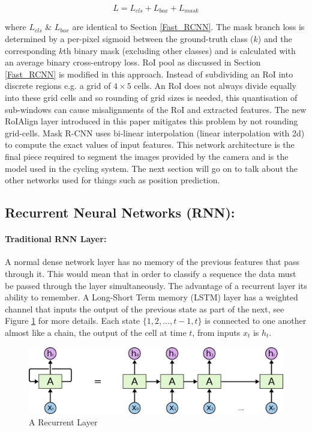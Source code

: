 \documentclass[11pt,twoside]{report}
\begin{document}
\begin{equation}
\label{maskrcnnloss}
L = L_{cls} + L_{box} + L_{mask}
\end{equation}

where $L_{cls}$ \& $L_{box}$ are identical to Section \ref{Fast_RCNN}. The mask branch loss is determined by a per-pixel sigmoid between the ground-truth class ($k$) and the corresponding $k$th binary mask (excluding other classes) and is calculated with an average binary cross-entropy loss.
\newline \newline
RoI pool as discussed in Section \ref{Fast_RCNN} is modified in this approach. Instead of subdividing an RoI into discrete regions e.g. a grid of $4 \times 5$ cells. An RoI does not always divide equally into these grid cells and so rounding of grid sizes is needed, this quantisation of sub-windows can cause misalignments of the RoI and extracted features. The new RoIAlign layer introduced in this paper mitigates this problem by not rounding grid-cells. Mask R-CNN uses bi-linear interpolation (linear interpolation with 2d) to compute the exact values of input features.
\newline \newline
This network architecture is the final piece required to segment the images provided by the camera and is the model used in the cycling system. The next section will go on to talk about the other networks used for things such as position prediction.
\subsection{Recurrent Neural Networks (RNN):}

\paragraph{Traditional RNN Layer:}A normal dense network layer has no memory of the previous features that pass through it. This would mean that in order to classify a sequence the data must be passed through the layer simultaneously. The advantage of a recurrent layer its ability to remember. A Long-Short Term memory (LSTM) layer has a weighted channel that inputs the output of the previous state as part of the next, see Figure \ref{rnn_unrolled} for more details. Each state $ \{ 1,2,...,t-1,t \}$ is connected to one another almost like a chain, the output of the cell at time $t$, from inputs $x_{t}$ is $h_{t}$.

\noindent \begin{figure}[h!]
	\includegraphics[width = 1.0\hsize]{./figures/RNN-unrolled.png}
	\caption{A Recurrent Layer \cite{Christopher_Olah_Blog}}
	\label{rnn_unrolled}
\end{figure}
\end{document}
